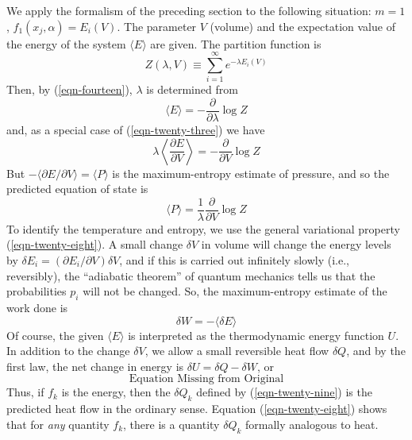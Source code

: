 \documentclass[]{article}
\begin{document}
We apply the formalism of the preceding section to the following situation: $m =1$, $f_{1}\left( x _{ j }, \alpha\right)= E _{ i }( V ) .$ The parameter $V$ (volume)
and the expectation value of the energy of the system $\langle E\rangle$ are given. The partition function is
\begin{equation}
Z(\lambda, V) \equiv \sum_{i=1}^{\infty} e^{-\lambda E_{i}(V)}
\end{equation}
Then, by (\ref{eqn-fourteen}), $\lambda$ is determined from
\begin{equation}
\langle E\rangle=-\frac{\partial}{\partial \lambda} \log Z
\end{equation}
and, as a special case of (\ref{eqn-twenty-three}) we have
\begin{equation}
\lambda\left\langle\frac{\partial E}{\partial V}\right\rangle=-\frac{\partial}{\partial V} \log Z
\end{equation}
But $-\langle\partial E / \partial V\rangle=\langle P\rangle$ is the maximum-entropy estimate of pressure, and so the predicted equation of state is
\begin{equation}
\langle P \rangle=\frac{1}{\lambda} \frac{\partial}{\partial V} \log Z
\end{equation}
To identify the temperature and entropy, we use the general variational property (\ref{eqn-twenty-eight}). A small change $\delta V$ in volume will change the energy levels by $\delta E _{ i }=\left(\partial E _{ i } / \partial V \right) \delta V$, and if this is carried out infinitely slowly (i.e., reversibly), the ``adiabatic theorem'' of quantum mechanics tells us that the probabilities $p _{ i }$ will not be changed. So, the maximum-entropy estimate of the work done is
\begin{equation}
\delta W=-\langle\delta E\rangle
\end{equation}
Of course, the given $\langle E\rangle$ is interpreted as the thermodynamic energy function $U$. In addition to the change $\delta V$, we allow a small reversible heat flow $\delta Q$, and by the first law, the net change in energy is $\delta U =\delta Q -\delta W$, or 
%
\begin{equation}
\text{Equation Missing from Original} \label{eqn-forty}    
\end{equation}
%
Thus, if $f_{k}$ is the energy, then the $\delta Q_{k}$ defined by (\ref{eqn-twenty-nine}) is the predicted heat flow in the ordinary sense. Equation (\ref{eqn-twenty-eight}) shows that for \emph{any} quantity $f_{k}$, there is a quantity $\delta Q_{k}$ formally analogous to heat. 
\end{document}
